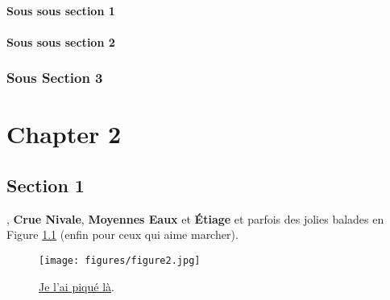 \documentclass{config}
\begin{document}
\subsubsection*{Sous sous section 1}
\noindent \lipsum[6][1]

\subsubsection*{Sous sous section 2}
\noindent \noindent \lipsum[6][2]

\subsection{Sous Section 3}
\lipsum[7-8]



\chapter{Chapter 2}
\section{Section 1}
, {\bfseries\color{LightBlue}Crue Nivale}, {\bfseries\color{Green}Moyennes Eaux} et {\bfseries\color{Red}Étiage}
et parfois des jolies balades en Figure \ref{fig:figure2} (enfin pour ceux qui aime marcher).

\begin{figure}[H]
  \centering
  \vspace{0mm}
  \texttt{[image: figures/figure2.jpg]}
  \vspace{-2mm}
  \caption{\href{https://saam.inrae.fr/}{Je l'ai piqué là}.}
  \label{fig:figure2}
  \vspace{-1mm}
\end{figure}

\lipsum[10-11] 


\printbibliography[heading=none]


\newpage
{
  \thiswatermark{}
  \pagestyle{empty}
  
}


\newpage
{
  \thiswatermark{}
  \pagestyle{empty}
  
}


\end{document}
